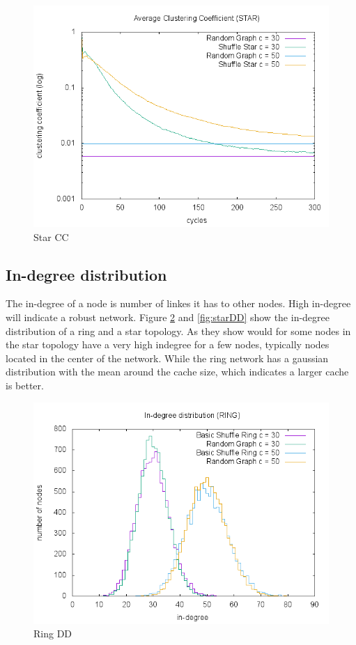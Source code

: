 \documentclass[UKenglish]{article}  %
\begin{document}
\begin{figure}
\includegraphics[scale=0.6]{plot/starCC.png}
	\caption{Star CC}
	\label{fig:starCC}
\end{figure}


\subsection{In-degree distribution}
The in-degree of a node is number of linkes it has to other nodes. High in-degree will indicate a robust network. Figure \ref{fig:ringDD} and \ref{fig:starDD} show the in-degree distribution of a ring and a star topology. As they show would for some nodes in the star topology have a very high indegree for a few nodes, typically nodes located in the center of the network. While the ring network has a gaussian distribution with the mean around the cache size, which indicates a larger cache is better. 
\begin{figure}
\includegraphics[scale=0.6]{plot/ringDD.png}
	\caption{Ring DD}
	\label{fig:ringDD}
\end{figure}
\end{document}
